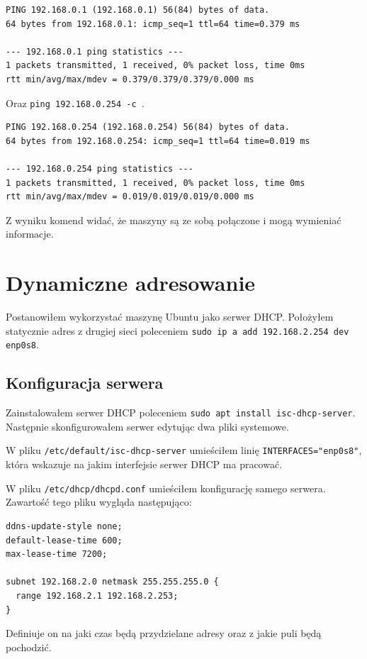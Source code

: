\documentclass{mwart} %
\begin{document}
\begin{verbatim}
PING 192.168.0.1 (192.168.0.1) 56(84) bytes of data. 
64 bytes from 192.168.0.1: icmp_seq=1 ttl=64 time=0.379 ms

--- 192.168.0.1 ping statistics ---
1 packets transmitted, 1 received, 0% packet loss, time 0ms
rtt min/avg/max/mdev = 0.379/0.379/0.379/0.000 ms
\end{verbatim}

Oraz \texttt{ping 192.168.0.254 -c }.

\begin{verbatim}
PING 192.168.0.254 (192.168.0.254) 56(84) bytes of data. 
64 bytes from 192.168.0.254: icmp_seq=1 ttl=64 time=0.019 ms

--- 192.168.0.254 ping statistics ---
1 packets transmitted, 1 received, 0% packet loss, time 0ms
rtt min/avg/max/mdev = 0.019/0.019/0.019/0.000 ms
\end{verbatim}

Z wyniku komend widać, że maszyny są ze sobą połączone i mogą wymieniać informacje.

\section{Dynamiczne adresowanie}
Postanowiłem wykorzystać maszynę Ubuntu jako serwer DHCP. Położyłem statycznie adres z drugiej sieci poleceniem \texttt{sudo ip a add 192.168.2.254 dev enp0s8}.

\subsection{Konfiguracja serwera}
Zainstalowałem serwer DHCP poleceniem \texttt{sudo apt install isc-dhcp-server}. Następnie skonfigurowałem serwer edytując dwa pliki systemowe.

W pliku \texttt{/etc/default/isc-dhcp-server} umieściłem linię \texttt{INTERFACES="enp0s8"}, która wskazuje na jakim interfejsie serwer DHCP ma pracować.

W pliku \texttt{/etc/dhcp/dhcpd.conf} umieściłem konfigurację samego serwera. Zawartość tego pliku wygląda następująco:

\begin{verbatim}
ddns-update-style none;
default-lease-time 600;
max-lease-time 7200;

subnet 192.168.2.0 netmask 255.255.255.0 {
  range 192.168.2.1 192.168.2.253;
}
\end{verbatim}

Definiuje on na jaki czas będą przydzielane adresy oraz z jakie puli będą pochodzić.
\end{document}
